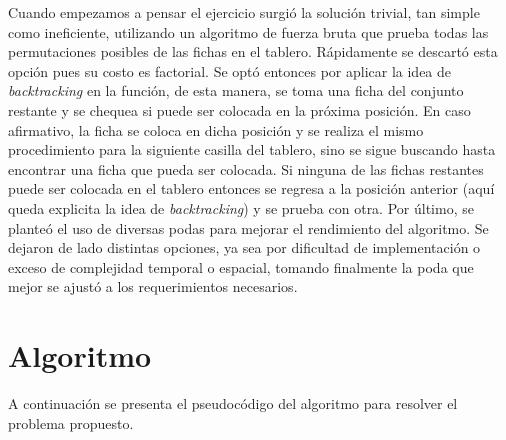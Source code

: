 \documentclass[a4paper,10pt] {article}
\begin{document}
Cuando empezamos a pensar el ejercicio surgi\'o la soluci\'on trivial, tan simple como ineficiente, utilizando un algoritmo de fuerza bruta que prueba todas las permutaciones posibles de las fichas en el tablero. R\'apidamente se descart\'o esta opci\'on pues su costo es factorial. Se opt\'o entonces por aplicar la idea de \textit{backtracking} en la funci\'on, de esta manera, se toma una ficha del conjunto restante y se chequea si puede ser colocada en la pr\'oxima posici\'on. En caso afirmativo, la ficha se coloca en dicha posici\'on y se realiza el mismo procedimiento para la siguiente casilla del tablero, sino se sigue buscando hasta encontrar una ficha que pueda ser colocada. Si ninguna de las fichas restantes puede ser colocada en el tablero entonces se regresa a la posici\'on anterior (aqu\'i queda explicita la idea de \textit{backtracking}) y se prueba con otra. Por \'ultimo, se plante\'o el uso de diversas podas para mejorar el rendimiento del algoritmo. Se dejaron de lado distintas opciones, ya sea por dificultad de implementaci\'on o exceso de complejidad temporal o espacial, tomando finalmente la poda que mejor se ajust\'o a los requerimientos necesarios.

\section*{Algoritmo}

A continuaci\'on se presenta el pseudoc\'odigo del algoritmo para resolver el problema propuesto.
\end{document}
